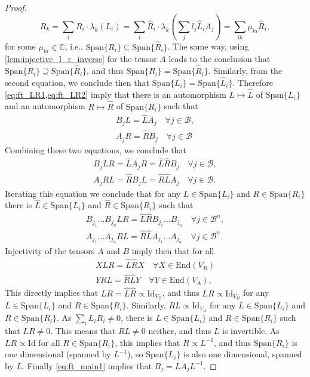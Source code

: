 \documentclass{article}
\newcommand{\id}{\mathrm{Id}}
\newcommand{\End}{\mathrm{End}}
\newcommand{\Span}{\mathrm{Span}}
\begin{document}
\begin{proof}
  \begin{equation*}
    R_k = \sum_{i} R_i \cdot \lambda_k(L_i) =  \sum_{i} \hat R_i \cdot \lambda_k\left(\sum_j l_j\hat L_i A_j \right) = \sum_{ik} \mu_{ki} \hat R_i,
  \end{equation*}
  for some $\mu_{ki} \in \mathbb{C}$, i.e., $\Span\{R_i\} \subseteq \Span\{\hat R_i\}$. The same way, using \cref{lem:injective_l_r_inverse} for the tensor $A$  leads to the conclusion that $\Span\{R_i\} \supseteq \Span\{\hat R_i\}$, and thus $\Span\{R_i\} = \Span\{\hat R_i\}$. Similarly, from the second equation, we conclude then that $\Span\{L_i\} = \Span\{\hat L_i\}$. Therefore \cref{eq:ft_LR1,eq:ft_LR2} imply that there is an automorphism $L\mapsto \hat{L}$ of $\Span\{L_i\}$ and an automorphism $R\mapsto \hat{R}$ of $\Span\{R_i\}$ such that 
  \begin{align}
    B_jL = \hat{L}A_j \quad \forall j \in \mathcal{B}, \label{eq:ft_main1}\\
    A_jR = \hat R B_j \quad \forall j \in \mathcal{B} \label{eq:ft_main2}
  \end{align}  
  Combining these two equations, we conclude that
  \begin{align*}
    B_j LR = \hat L A_j R = \hat L \hat R B_j \quad \forall j\in\mathcal{B},\\
    A_j RL = \hat R B_j L = \hat R \hat L A_j \quad \forall j\in\mathcal{B}.
  \end{align*}
  Iterating this equation we conclude that for any $L\in\Span\{L_i\}$ and $R\in\Span\{R_i\}$ there is $ \hat{L} \in \Span\{L_i\}$ and  $\hat{R} \in \Span\{R_i\}$ such that 
  \begin{align*}
    B_{j_1} \dots B_{j_n} LR = \hat L \hat R B_{j_1} \dots B_{j_n} \quad \forall j\in\mathcal{B}^n, \\
    A_{j_1} \dots A_{j_n} RL = \hat R \hat L A_{j_1} \dots A_{j_n} \quad \forall j\in\mathcal{B}^n.
  \end{align*}
  Injectivity of the tensors $A$ and $B$ imply then that for all 
  \begin{align*}
    X LR = \hat L \hat R X \quad \forall X\in \End(V_B) \\
    Y RL = \hat R \hat L Y \quad \forall Y\in \End(V_A),
  \end{align*}
  This directly implies that $LR = \hat{L}\hat{R} \propto \id_{V_B}$, and thus $LR\propto \id_{V_B}$ for any $L\in\Span\{L_i\}$ and $R\in \Span\{R_i\}$. Similarly, $RL\propto \id_{V_A}$ for any $L\in\Span\{L_i\}$ and $R\in \Span\{R_i\}$.  As $\sum_i L_i R_i \neq 0$, there is $L\in \Span\{L_i\}$ and $R\in \Span\{R_i\}$ such that $LR\neq 0$. This means that $RL\neq 0$ neither, and thus $L$ is invertible. As $LR \propto \id$ for all $R\in \Span\{R_i\}$, this implies that $R\propto L^{-1}$, and thus $\Span\{R_i\}$ is one dimensional (spanned by $L^{-1}$), so $\Span\{L_i\}$ is also one dimensional, spanned by $L$. Finally \cref{eq:ft_main1} implies that $B_j = LA_j L^{-1}$.
\end{proof}
\end{document}
